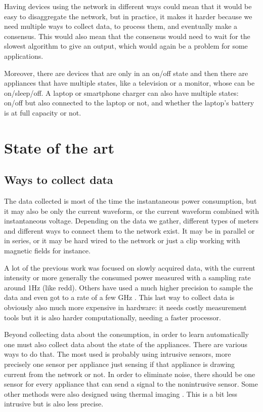 Having devices using the network in different ways could mean that it would be easy to disaggregate the network, but in practice, it makes it harder because we need multiple ways to collect data, to process them, and eventually make a consensus. This would also mean that the consensus would need to wait for the slowest algorithm to give an output, which would again be a problem for some applications.

Moreover, there are devices that are only in an on/off state and then there are appliances that have multiple states, like a television or a monitor, whose can be on/sleep/off. A laptop or smartphone charger can also have multiple states: on/off but also connected to the laptop or not, and whether the laptop's battery is at full capacity or not.

\section{State of the art}
\subsection{Ways to collect data}
The data collected is most of the time the instantaneous power consumption, but it may also be only the current waveform, or the current waveform combined with instantaneous voltage. Depending on the data we gather, different types of meters and different ways to connect them to the network exist. It may be in parallel or in series, or it may be hard wired to the network or just a clip working with magnetic fields for instance.

A lot of the previous work was focused on slowly acquired data, with the current intensity or more generally the consumed power measured with a sampling rate around 1Hz (like \acrshort{redd}\cite{kolter2011redd}). Others have used a much higher precision to sample the data and even got to a rate of a few GHz \cite{gupta2010electrisense}. This last way to collect data is obviously also much more expensive in hardware: it needs costly measurement tools but it is also harder computationally, needing a faster processor.

Beyond collecting data about the consumption, in order to learn automatically one must also collect data about the state of the appliances. There are various ways to do that. The most used is probably using intrusive sensors, more precisely one sensor per appliance just sensing if that appliance is drawing current from the network or not. In order to eliminate noise, there should be one sensor for every appliance that can send a signal to the nonintrusive sensor.
Some other methods were also designed using thermal imaging \cite{ho2011heatprobe}. This is a bit less intrusive but is also less precise.

